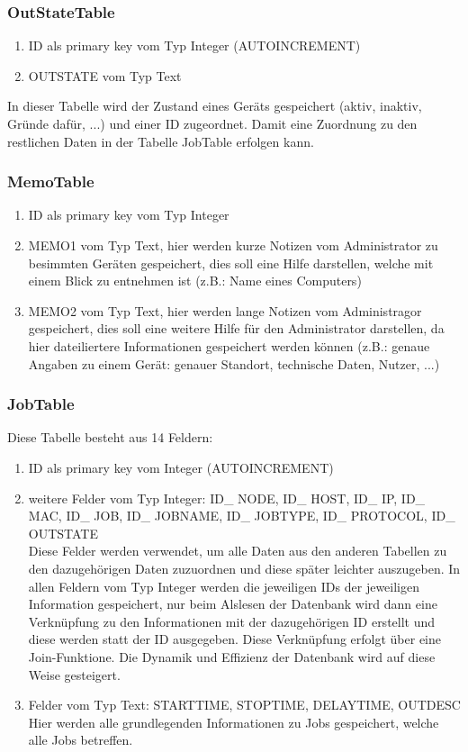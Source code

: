 \documentclass[12pt,a4paper]{report}
\begin{document}
\begin{onehalfspace}
\subsubsection{OutStateTable}
\begin{enumerate}
\item ID als primary key vom Typ Integer (AUTOINCREMENT)
\item OUTSTATE vom Typ Text
\end{enumerate}
In dieser Tabelle wird der Zustand eines Geräts gespeichert (aktiv, inaktiv, Gründe dafür, ...) und einer ID zugeordnet. Damit eine Zuordnung zu den restlichen Daten in der Tabelle JobTable erfolgen kann.
\subsubsection{MemoTable}
\begin{enumerate}
\item ID als primary key vom Typ Integer
\item MEMO1 vom Typ Text, hier werden kurze Notizen vom Administrator zu besimmten Geräten gespeichert, dies soll eine Hilfe darstellen, welche mit einem Blick zu entnehmen ist (z.B.: Name eines Computers)
\item MEMO2 vom Typ Text, hier werden lange Notizen vom Administragor gespeichert, dies soll eine weitere Hilfe für den Administrator darstellen, da hier dateiliertere Informationen gespeichert werden können (z.B.: genaue Angaben zu einem Gerät: genauer Standort, technische Daten, Nutzer, ...)
\end{enumerate}
\subsubsection{JobTable}
Diese Tabelle besteht aus 14 Feldern:
\begin{enumerate}
\item ID als primary key vom Integer (AUTOINCREMENT)
\item weitere Felder vom Typ Integer: ID\_ NODE, ID\_ HOST, ID\_ IP, ID\_ MAC, ID\_ JOB, ID\_ JOBNAME, ID\_ JOBTYPE, ID\_ PROTOCOL, ID\_ OUTSTATE\\
Diese Felder werden verwendet, um alle Daten aus den anderen Tabellen zu den dazugehörigen Daten zuzuordnen und diese später leichter auszugeben. In allen Feldern vom Typ Integer werden die jeweiligen IDs der jeweiligen Information gespeichert, nur beim Alslesen der Datenbank wird dann eine Verknüpfung zu den Informationen mit der dazugehörigen ID erstellt und diese werden statt der ID ausgegeben.  Diese Verknüpfung erfolgt über eine Join-Funktione. Die Dynamik und Effizienz der Datenbank wird auf diese Weise gesteigert.
\item Felder vom Typ Text: STARTTIME, STOPTIME, DELAYTIME, OUTDESC\\
Hier werden alle grundlegenden Informationen zu Jobs gespeichert, welche alle Jobs betreffen.
\end{enumerate}

\end{onehalfspace}
\end{document}
